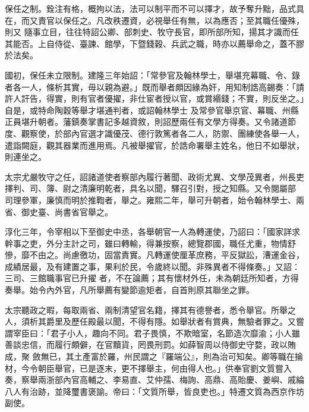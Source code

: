 
\begin{pinyinscope}

 保任之制。銓注有格，概拘以法，法可以制平而不可以擇才，故予奪升黜，品式具在，而又責官以保任之。凡改秩遷資，必視舉任有無，以為應否；至其職任優殊，則又
 隨事立目，往往特詔公卿、部刺史、牧守長官，即所部所知，揚其才識而任其能否。上自侍從、臺諫、館學，下暨錢穀、兵武之職，時亦以薦舉命之，蓋不膠於法矣。



 國初，保任未立限制。建隆三年始詔：「常參官及翰林學士，舉堪充幕職、令、錄者各一人，條析其實，毋以親為避。」既而舉者頗因緣為奸，用知制誥高錫奏：「請許人訐告，得實，則有官者優擢，非仕宦者授以官，或賞緡錢；不實，則反坐之。」自是，或特命陶穀等舉才堪通判者，或詔翰林學士
 及常參官舉京官、幕職、州縣正員堪升朝者。藩鎮奏掌書記多越資敘，則詔歷兩任有文學方得奏。又令諸道節度、觀察使，於部內官選才識優茂、德行敦篤者各二人，防禦、團練使各舉一人，遣詣闕庭，觀其器業而進用焉。凡被舉擢官，於誥命署舉主姓名，他日不如舉狀，則連坐之。



 太宗尤嚴牧守之任，詔諸道使者察部內履行著聞、政術尤異、文學茂異者，州長吏擇判、司、簿、尉之清廉明乾者，具名以聞，驛召引對，授之知縣。又令閱屬部
 司理參軍，廉慎而明於推鞫者，舉之。雍熙二年，舉可升朝者，始令翰林學士、兩省、御史臺、尚書省官舉之。



 淳化三年，令宰相以下至御史中丞，各舉朝官一人為轉運使，乃詔曰：「國家詳求幹事之吏，外分主計之司，雖曰轉輸，得兼按察，總覽郡國，職任尤重，物情舒慘，靡不由之。尚慮徼功，固當責實。凡轉運使厘革庶務，平反獄訟，漕運金谷，成績居最，及有建置之事，果利於民，令歲終以聞。非殊異者不得條奏。」又詔：三司、三館職事官已升擢
 者，不在論薦；其有懷材外任，未為朝廷所知者，方得奏舉。始令內外官，凡所舉薦有變節逾矩者，自首則原其聯坐之罪。



 太宗聽政之暇，每取兩省、兩制清望官名籍，擇其有德譽者，悉令舉官。所舉之人，須析其爵里及歷任殿最以聞，不得有隱。如舉狀者有賞典，無驗者罪之。又嘗謂宰臣曰：「君子小人，趣向不同。君子畏慎，不欺暗室，名節造次靡渝；小人雖善談忠信，而履行頗僻，在官黷貨，罔畏刑罰。如薛智周以侍御史守婺，政以賄成，聚
 斂無已，其土產富於羅，州民謂之『羅端公』，則為治可知矣。卿等職在掄材，今令朝臣舉官，已是逐末，更不擇舉主，何由得人也。」供奉官劉文質嘗入奏，察舉兩浙部內官高輔之、李易直、艾仲孺、梅詢、高鼎、高貽慶、姜嶼、戚綸八人有治跡，並降璽書褒諭。帝曰：「文質所舉，皆良吏也。」特遷文質為西京作坊副使。




\end{pinyinscope}
